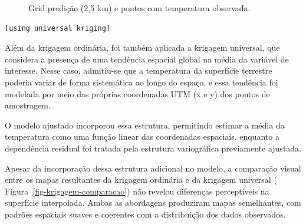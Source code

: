 \documentclass[
  letterpaper,
  DIV=11,
  numbers=noendperiod]{scrartcl}
\begin{document}
\label{cell-fig-grade-krigagem}
\begin{figure}[H]


\caption{\label{fig-grade-krigagem}Grid predição (2,5 km) e pontos com
temperatura observada.}

\end{figure}%

\begin{verbatim}
[using universal kriging]
\end{verbatim}

Além da krigagem ordinária, foi também aplicada a krigagem universal,
que considera a presença de uma tendência espacial global na média da
variável de interesse. Nesse caso, admitiu-se que a temperatura da
superfície terrestre poderia variar de forma sistemática ao longo do
espaço, e essa tendência foi modelada por meio das próprias coordenadas
UTM (x e y) dos pontos de amostragem.

O modelo ajustado incorporou essa estrutura, permitindo estimar a média
da temperatura como uma função linear das coordenadas espaciais,
enquanto a dependência residual foi tratada pela estrutura variográfica
previamente ajustada.

Apesar da incorporação dessa estrutura adicional no modelo, a comparação
visual entre os mapas resultantes da krigagem ordinária e da krigagem
universal ( Figura~\ref{fig-krigagem-comparacao}) não revelou diferenças
perceptíveis na superfície interpolada. Ambas as abordagens produziram
mapas semelhantes, com padrões espaciais suaves e coerentes com a
distribuição dos dados observados.
\end{document}
